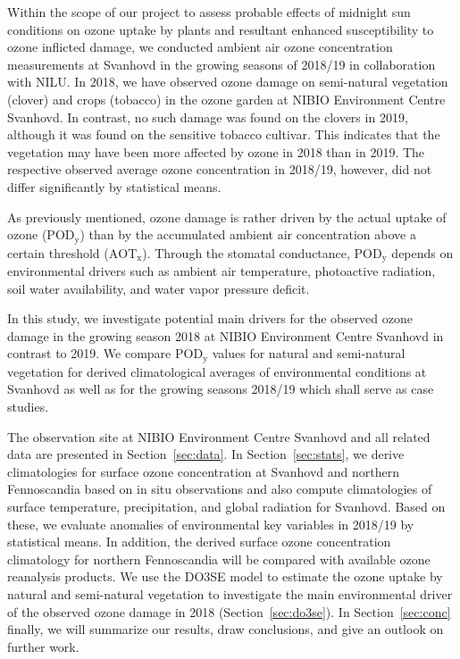 \documentclass[bg, manuscript]{copernicus}
\begin{document}
Within the scope of our project to assess probable effects of midnight sun conditions on ozone uptake by plants and resultant enhanced susceptibility to ozone inflicted damage, we conducted ambient air ozone concentration measurements at Svanhovd in the growing seasons of 2018/19 in collaboration with NILU. 
In 2018, we have observed ozone damage on semi-natural vegetation (clover) and crops (tobacco) in the ozone garden at NIBIO Environment Centre Svanhovd. In contrast, no such damage was found on the clovers in 2019, although it was found on the sensitive tobacco cultivar. This indicates that the vegetation may have been more affected by ozone in 2018 than in 2019.
The respective observed average ozone concentration in 2018/19, however, did not differ significantly by statistical means.

As previously mentioned, ozone damage is rather driven by the actual uptake of ozone ($\mathrm{POD_y}$) than by the accumulated ambient air concentration above a certain threshold ($\mathrm{AOT_x}$). Through the stomatal conductance, $\mathrm{POD_y}$ depends on environmental drivers such as ambient air temperature, photoactive radiation, soil water availability, and water vapor pressure deficit.

In this study, we investigate potential main drivers for the observed ozone damage in the growing season 2018 at NIBIO Environment Centre Svanhovd in contrast to 2019. We compare $\mathrm{POD_y}$ values for natural and semi-natural vegetation for derived climatological averages of environmental conditions at Svanhovd as well as for the growing seasons 2018/19 which shall serve as case studies.

The observation site at NIBIO Environment Centre Svanhovd and all related data are presented in Section~\ref{sec:data}. In Section~\ref{sec:stats}, we derive climatologies for surface ozone concentration at Svanhovd and northern Fennoscandia based on in situ observations and also compute climatologies of surface temperature, precipitation, and global radiation for Svanhovd. Based on these, we evaluate anomalies of environmental key variables in 2018/19 by statistical means. In addition, the derived surface ozone concentration climatology for northern Fennoscandia will be compared with available ozone reanalysis products. We use the DO3SE model to estimate the ozone uptake by natural and semi-natural vegetation to investigate the main environmental driver of the observed ozone damage in 2018 (Section~\ref{sec:do3se}). In Section~\ref{sec:conc} finally, we will summarize our results, draw conclusions, and give an outlook on further work.
\end{document}
